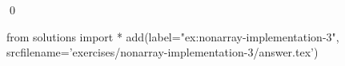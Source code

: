 
\begin{ex} 
  \label{ex:nonarray-implementation-3}
  
  \qed
\end{ex} 
\begin{python0}
from solutions import *
add(label="ex:nonarray-implementation-3",
    srcfilename='exercises/nonarray-implementation-3/answer.tex') 
\end{python0}
